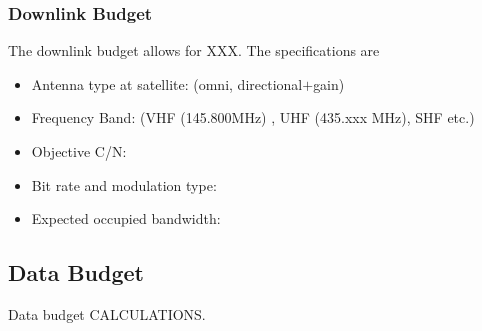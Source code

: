 \subsubsection{Downlink Budget}
The downlink budget allows for XXX. The specifications are
\begin{itemize}
    \item Antenna type at satellite: (omni, directional$+$gain)
    \item Frequency Band: (VHF (145.800MHz) , UHF (435.xxx MHz), SHF etc.)
    \item Objective C/N:
    \item Bit rate and modulation type:
    \item Expected occupied bandwidth:
\end{itemize}

\subsection{Data Budget}
Data budget CALCULATIONS.


